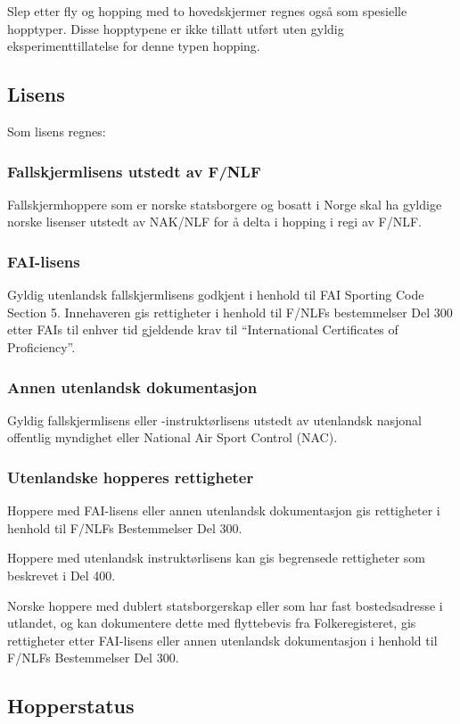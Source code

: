 Slep etter fly og hopping med to hovedskjermer regnes også som spesielle hopptyper. Disse hopptypene er ikke tillatt utført uten gyldig eksperimenttillatelse for denne typen hopping.

\subsection{Lisens}
Som lisens regnes:

\subsubsection{Fallskjermlisens utstedt av F/NLF}
Fallskjermhoppere som er norske statsborgere og bosatt i Norge skal ha gyldige norske lisenser utstedt av NAK/NLF for å delta i hopping i regi av F/NLF.

\subsubsection{FAI-lisens}
Gyldig utenlandsk fallskjermlisens godkjent i henhold til FAI Sporting Code Section 5. Innehaveren gis rettigheter i henhold til F/NLFs bestemmelser Del 300 etter FAIs til enhver tid gjeldende krav til ``International Certificates of Proficiency''.

\subsubsection{Annen utenlandsk dokumentasjon}
Gyldig fallskjermlisens eller -instruktørlisens utstedt av utenlandsk nasjonal offentlig myndighet eller National Air Sport Control (NAC).

\subsubsection{Utenlandske hopperes rettigheter}
Hoppere med FAI-lisens eller annen utenlandsk dokumentasjon gis rettigheter i henhold til F/NLFs Bestemmelser Del 300.

Hoppere med utenlandsk instruktørlisens kan gis begrensede rettigheter som beskrevet i Del 400.

Norske hoppere med dublert statsborgerskap eller som har fast bostedsadresse i utlandet, og kan dokumentere dette med flyttebevis fra Folkeregisteret, gis rettigheter etter FAI-lisens eller annen utenlandsk dokumentasjon i henhold til F/NLFs Bestemmelser Del 300.

\subsection{Hopperstatus}
